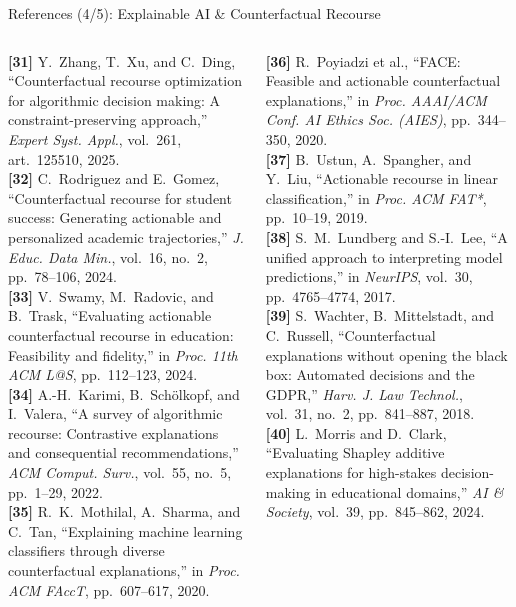 \documentclass{beamer}
\begin{document}
\begin{frame}[t]{References (4/5): Explainable AI \& Counterfactual Recourse}
  \begin{columns}[T]
    \fontsize{5.2pt}{6.4pt}\selectfont
    \textbf{[31]} Y.~Zhang, T.~Xu, and C.~Ding, ``Counterfactual recourse optimization for algorithmic decision making: A constraint-preserving approach,'' \textit{Expert Syst. Appl.}, vol.~261, art.~125510, 2025.\\[4pt]
    \textbf{[32]} C.~Rodriguez and E.~Gomez, ``Counterfactual recourse for student success: Generating actionable and personalized academic trajectories,'' \textit{J. Educ. Data Min.}, vol.~16, no.~2, pp.~78--106, 2024.\\[4pt]
    \textbf{[33]} V.~Swamy, M.~Radovic, and B.~Trask, ``Evaluating actionable counterfactual recourse in education: Feasibility and fidelity,'' in \textit{Proc. 11th ACM L@S}, pp.~112--123, 2024.\\[4pt]
    \textbf{[34]} A.-H.~Karimi, B.~Sch{\"o}lkopf, and I.~Valera, ``A survey of algorithmic recourse: Contrastive explanations and consequential recommendations,'' \textit{ACM Comput. Surv.}, vol.~55, no.~5, pp.~1--29, 2022.\\[4pt]
    \textbf{[35]} R.~K.~Mothilal, A.~Sharma, and C.~Tan, ``Explaining machine learning classifiers through diverse counterfactual explanations,'' in \textit{Proc. ACM FAccT}, pp.~607--617, 2020.

    \fontsize{5.2pt}{6.4pt}\selectfont
    \textbf{[36]} R.~Poyiadzi et al., ``FACE: Feasible and actionable counterfactual explanations,'' in \textit{Proc. AAAI/ACM Conf. AI Ethics Soc. (AIES)}, pp.~344--350, 2020.\\[4pt]
    \textbf{[37]} B.~Ustun, A.~Spangher, and Y.~Liu, ``Actionable recourse in linear classification,'' in \textit{Proc. ACM FAT*}, pp.~10--19, 2019.\\[4pt]
    \textbf{[38]} S.~M.~Lundberg and S.-I.~Lee, ``A unified approach to interpreting model predictions,'' in \textit{NeurIPS}, vol.~30, pp.~4765--4774, 2017.\\[4pt]
    \textbf{[39]} S.~Wachter, B.~Mittelstadt, and C.~Russell, ``Counterfactual explanations without opening the black box: Automated decisions and the GDPR,'' \textit{Harv. J. Law Technol.}, vol.~31, no.~2, pp.~841--887, 2018.\\[4pt]
    \textbf{[40]} L.~Morris and D.~Clark, ``Evaluating Shapley additive explanations for high-stakes decision-making in educational domains,'' \textit{AI \& Society}, vol.~39, pp.~845--862, 2024.
  \end{columns}
\end{frame}
\end{document}
